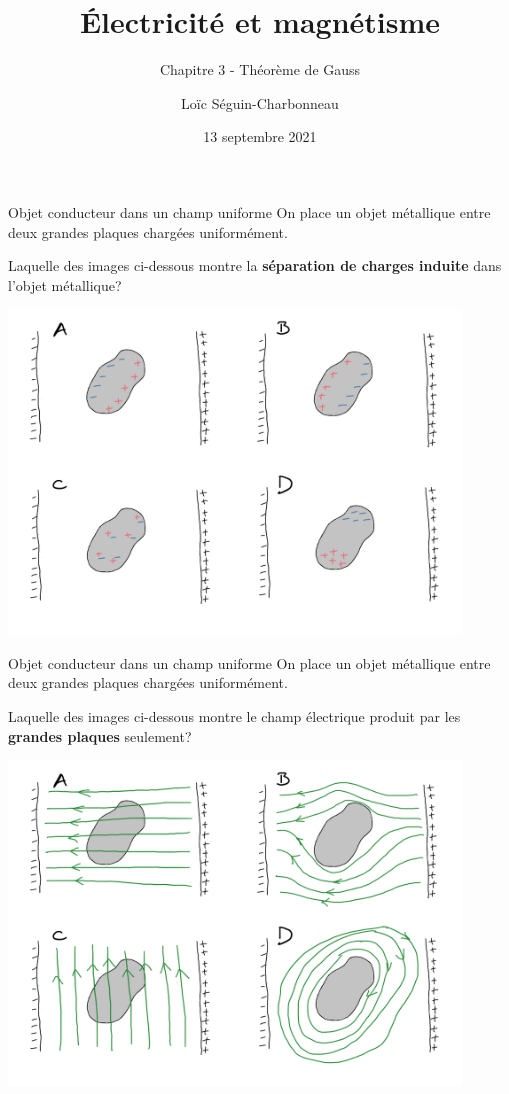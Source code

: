 \documentclass{beamer}
\title{Électricité et magnétisme}
\subtitle{Chapitre 3 - Théorème de Gauss}
\date{13 septembre 2021}
\author{Loïc Séguin-Charbonneau}
\institute{Cégep Édouard-Montpetit}
\begin{document}
\maketitle


\begin{frame}[t]{Objet conducteur dans un champ uniforme}
  On place un objet métallique entre deux grandes plaques chargées
  uniformément.

  Laquelle des images ci-dessous montre
  la \textbf{séparation de charges induite} dans l'objet métallique?

  \begin{center}
    \includegraphics[width=0.9\textwidth]{figures/champ_uniforme_charges_induites.png}
  \end{center}

\end{frame}


\begin{frame}[t]{Objet conducteur dans un champ uniforme}
  On place un objet métallique entre deux grandes plaques chargées
  uniformément.

  Laquelle des images ci-dessous montre
  le champ électrique produit par les \textbf{grandes plaques} seulement?


  \begin{center}
    \includegraphics[width=0.9\textwidth]{figures/champ_uniforme_champ_plaque.png}
  \end{center}
\end{frame}
\end{document}
